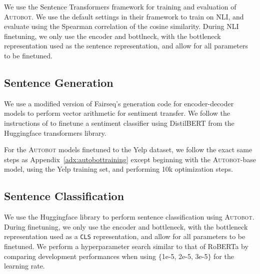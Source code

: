 We use the Sentence Transformers framework for training and evaluation of \textsc{Autobot}. We use the default settings in their framework to train on NLI, and evaluate using the Spearman correlation of the cosine similarity. During NLI finetuning, we only use the encoder and bottlneck, with the bottleneck representation used as the sentence representation, and allow for all parameters to be finetuned.

\subsection{Sentence Generation}

We use a modified version of Fairseq's generation code for encoder-decoder models to perform vector arithmetic for sentiment transfer. We follow the instructions of \citet{mai2020plug} to finetune a sentiment classifier using DistilBERT from the Huggingface transformers library.

For the \textsc{Autobot} models finetuned to the Yelp dataset, we follow the exact same steps as Appendix~\ref{adx:autobottraining} except beginning with the \textsc{Autobot}-base model, using the Yelp training set, and performing 10k optimization steps.

\subsection{Sentence Classification}

We use the Huggingface library to perform sentence classification using \textsc{Autobot}.  During finetuning, we only use the encoder and bottleneck, with the bottleneck representation used as a \texttt{CLS} representation, and allow for all parameters to be finetuned. We perform a hyperparameter search similar to that of RoBERTa by comparing development performances when using $\{$1e-5, 2e-5, 3e-5$\}$ for the learning rate.


